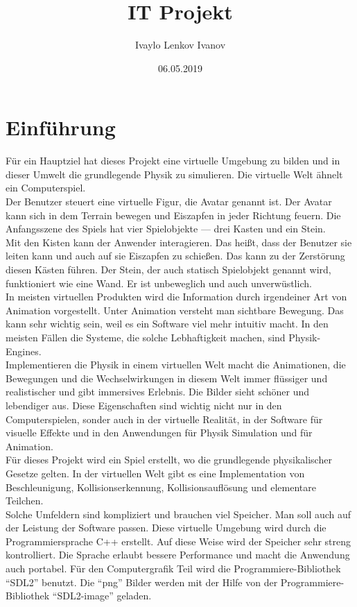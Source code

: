 \documentclass[
  10pt,
  a4paper,
  oneside,
  headers,
  headinclude,
  footinclude,
  BCOR5mm,
]{article}
\title{IT Projekt}
\date{06.05.2019}
\author{Ivaylo Lenkov Ivanov}
\begin{document}
\begin{titlepage}
  \maketitle
  \tableofcontents
  \pagebreak
  \listoffigures
\end{titlepage}

\section{Einführung}
Für ein Hauptziel hat dieses Projekt eine virtuelle Umgebung zu bilden und in
dieser Umwelt die grundlegende Physik zu simulieren. Die virtuelle Welt ähnelt
ein Computerspiel. \\
Der Benutzer steuert eine virtuelle Figur, die Avatar genannt ist.
Der Avatar kann sich in dem Terrain bewegen und Eiszapfen in jeder Richtung
feuern. Die Anfangsszene des Spiels hat vier Spielobjekte --- drei Kasten und
ein Stein. \\
Mit den Kisten kann der Anwender interagieren. Das heißt, dass der Benutzer sie
leiten kann und auch auf sie Eiszapfen zu schießen. Das kann zu der
Zerstörung diesen Kästen führen. Der Stein, der auch statisch Spielobjekt
genannt wird, funktioniert wie eine Wand. Er ist unbeweglich und auch
unverwüstlich. \\
In meisten virtuellen Produkten wird die Information durch irgendeiner Art von
Animation vorgestellt. Unter Animation versteht man sichtbare Bewegung. Das kann
sehr wichtig sein, weil es ein Software viel mehr intuitiv macht. In den meisten
Fällen die Systeme, die solche Lebhaftigkeit machen, sind Physik-Engines. \\
Implementieren die Physik in einem virtuellen Welt macht die Animationen, die
Bewegungen und die Wechselwirkungen in diesem Welt immer flüssiger und
realistischer und gibt immersives Erlebnis. Die Bilder sieht schöner und
lebendiger aus. Diese Eigenschaften sind wichtig nicht nur in den
Computerspielen, sonder auch in der virtuelle Realität, in der Software für
visuelle Effekte und in den Anwendungen für Physik Simulation und für
Animation. \\
Für dieses Projekt wird ein Spiel erstellt, wo die grundlegende physikalischer
Gesetze gelten. In der virtuellen Welt gibt es eine Implementation von
Beschleunigung, Kollisionserkennung, Kollisionsauflösung und elementare
Teilchen. \\
Solche Umfeldern sind kompliziert und brauchen viel Speicher. Man soll auch auf
der Leistung der Software passen. Diese virtuelle Umgebung wird durch die
Programmiersprache C++ erstellt. Auf diese Weise wird der Speicher sehr streng
kontrolliert. Die Sprache erlaubt bessere Performance und macht die Anwendung
auch portabel. Für den Computergrafik Teil wird die Programmiere-Bibliothek
``SDL2'' benutzt. Die ``png'' Bilder werden mit der Hilfe von der
Programmiere-Bibliothek ``SDL2-image'' geladen. \\
\end{document}
